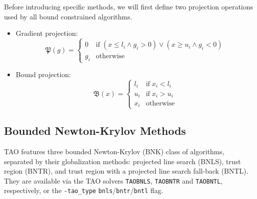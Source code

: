 Before introducing specific methods, we will first define two projection operations 
used by all bound constrained algorithms.
\begin{itemize}
\item Gradient projection:
\[
\mathfrak{P}(g) = \left\{\begin{array}{ll}
0 & \mbox{if} \; (x \leq l_i \land g_i > 0) \lor (x \geq u_i \land g_i < 0) \\
g_i & \mbox{otherwise}
\end{array}
\right.
\]
\item Bound projection:
\[
\mathfrak{B}(x) = \left\{\begin{array}{ll}
l_i & \mbox{if} \; x_i < l_i \\
u_i & \mbox{if} \; x_i > u_i \\
x_i & \mbox{otherwise}
\end{array}
\right.
\]
\end{itemize}

\subsection{Bounded Newton-Krylov Methods}\label{sec:bnk}

TAO features three bounded Newton-Krylov (BNK) class of algorithms, separated by their 
globalization methods: projected line search (BNLS), trust region (BNTR), and trust region 
with a projected line search fall-back (BNTL). They are available via the TAO 
solvers {\tt TAOBNLS}, {\tt TAOBNTR} and {\tt TAOBNTL}, respectively, or the 
{\tt -tao\_type} {\tt bnls}/{\tt bntr}/{\tt bntl} flag.

